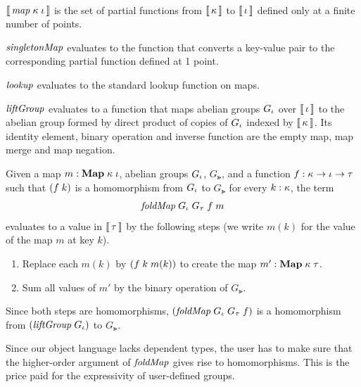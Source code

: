 \begin{oldSec}
\begin{definition}~
\begin{subdefinition}
\item $\Eval{\Map\Gk\Gi}$ is the set of partial functions from
$\Eval\Gk$ to $\Eval\Gi$ defined only at a finite number of
points.
\item $\mathit{singletonMap}$ evaluates to the function that converts a
key-value pair to the corresponding partial function defined at
1 point.
\item $\mathit{lookup}$ evaluates to the standard lookup function on
maps.
\item $\mathit{liftGroup}$ evaluates to a function that maps abelian
groups $G_\iota$ over $\Eval\Gi$ to the abelian group formed by
direct product of copies of $G_\iota$ indexed by $\Eval\Gk$. Its
identity element, binary operation and inverse function are the
empty map, map merge and map negation.
\item Given a map $\HasType m {\HashMap\Gk\Gi}$, abelian groups
$G_\iota$, $G_\Gt$, and a function $\HasType f
{\Fun\Gk{\Fun\Gi\Gt}}$ such that $\App*fk$ is a homomorphism from
$G_\iota$ to $G_\Gt$ for every $\HasType k\Gk$, the term
\[
\App{\App{\App{\App\FOLDMAP{G_\Gi}}{G_\Gt}}f}m
\]
evaluates to a value in $\Eval\Gt$ by the following steps (we
write $m(k)$ for the value of the map $m$ at key $k$).
\begin{enumerate}
\item Replace each $m(k)$ by $\App*{\App fk}{m(k)}$ to create the
map $\HasType{m'}{\HashMap\Gk\Gt}$.
\item Sum all values of $m'$ by the binary operation of $G_\Gt$.
\end{enumerate}
Since both steps are homomorphisms,
$\App*{\App{\App\FOLDMAP{G_\Gi}}{G_\Gt}}f$ is a homomorphism
from $\App*\LIFTGROUP{G_\Gi}$ to $G_\Gt$.
%
\end{subdefinition}
\end{definition}

Since our object language lacks dependent types, the user has to
make sure that the higher-order argument of $\mathit{foldMap}$ gives
rise to homomorphisms. This is the price paid for the
expressivity of user-defined groups.

\end{oldSec}

